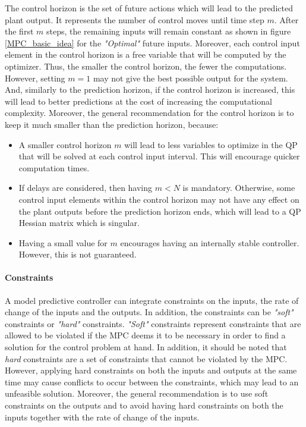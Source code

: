 \documentclass{thesisreport}
\begin{document}
The control horizon is the set of future actions which will lead to the predicted plant output. It represents the number of control moves until time step $m$. After the first $m$ steps, the remaining inputs will remain constant as shown in figure \ref{MPC_basic_idea} for the \textit{"Optimal"} future inputs. Moreover, each control input element in the control horizon is a free variable that will be computed by the optimizer. Thus, the smaller the control horizon, the fewer the computations. However, setting $m=1$ may not give the best possible output for the system. And, similarly to the prediction horizon, if the control horizon is increased, this will lead to better predictions at the cost of increasing the computational complexity. Moreover, the general recommendation for the control horizon is to keep it much smaller than the prediction horizon, because:

\begin{itemize}
	\item A smaller control horizon $m$ will lead to less variables to optimize in the QP that will be solved at each control input interval. This will encourage quicker computation times.
	\item If delays are considered, then having $m<N$ is mandatory. Otherwise, some control input elements within the control horizon  may not have any effect on the plant outputs before the prediction horizon ends, which will lead to a QP Hessian matrix which is singular. 
	\item Having a small value for $m$ encourages having an internally stable controller. However, this is not guaranteed.
\end{itemize}

\paragraph{Constraints} A model predictive controller can integrate constraints on the inputs, the rate of change of the inputs and the outputs. In addition, the constraints can be \textit{"soft"} constraints or \textit{"hard"} constraints. \textit{"Soft"} constraints represent constraints that are allowed to be violated if the MPC deems it to be necessary in order to find a solution for the control problem at hand.
In addition, it should be noted that \textit{hard} constraints are a set of constraints that cannot be violated by the MPC. However, applying hard constraints on both the inputs and outputs at the same time may cause conflicts to occur between the constraints, which may lead to an unfeasible solution. Moreover, the general recommendation is to use soft constraints on the outputs and to avoid having hard constraints on both the inputs together with the rate of change of the inputs.
\end{document}
